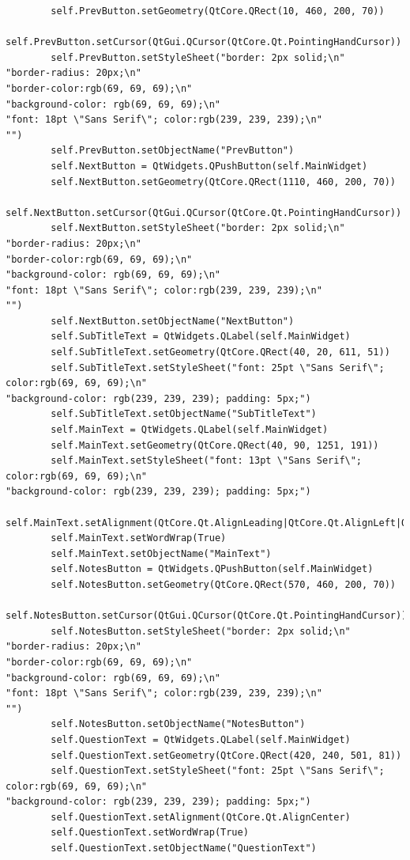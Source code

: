 \documentclass{article}
\begin{document}
\begin{lstlisting}
        self.PrevButton.setGeometry(QtCore.QRect(10, 460, 200, 70))
        self.PrevButton.setCursor(QtGui.QCursor(QtCore.Qt.PointingHandCursor))
        self.PrevButton.setStyleSheet("border: 2px solid;\n"
"border-radius: 20px;\n"
"border-color:rgb(69, 69, 69);\n"
"background-color: rgb(69, 69, 69);\n"
"font: 18pt \"Sans Serif\"; color:rgb(239, 239, 239);\n"
"")
        self.PrevButton.setObjectName("PrevButton")
        self.NextButton = QtWidgets.QPushButton(self.MainWidget)
        self.NextButton.setGeometry(QtCore.QRect(1110, 460, 200, 70))
        self.NextButton.setCursor(QtGui.QCursor(QtCore.Qt.PointingHandCursor))
        self.NextButton.setStyleSheet("border: 2px solid;\n"
"border-radius: 20px;\n"
"border-color:rgb(69, 69, 69);\n"
"background-color: rgb(69, 69, 69);\n"
"font: 18pt \"Sans Serif\"; color:rgb(239, 239, 239);\n"
"")
        self.NextButton.setObjectName("NextButton")
        self.SubTitleText = QtWidgets.QLabel(self.MainWidget)
        self.SubTitleText.setGeometry(QtCore.QRect(40, 20, 611, 51))
        self.SubTitleText.setStyleSheet("font: 25pt \"Sans Serif\"; color:rgb(69, 69, 69);\n"
"background-color: rgb(239, 239, 239); padding: 5px;")
        self.SubTitleText.setObjectName("SubTitleText")
        self.MainText = QtWidgets.QLabel(self.MainWidget)
        self.MainText.setGeometry(QtCore.QRect(40, 90, 1251, 191))
        self.MainText.setStyleSheet("font: 13pt \"Sans Serif\"; color:rgb(69, 69, 69);\n"
"background-color: rgb(239, 239, 239); padding: 5px;")
        self.MainText.setAlignment(QtCore.Qt.AlignLeading|QtCore.Qt.AlignLeft|QtCore.Qt.AlignTop)
        self.MainText.setWordWrap(True)
        self.MainText.setObjectName("MainText")
        self.NotesButton = QtWidgets.QPushButton(self.MainWidget)
        self.NotesButton.setGeometry(QtCore.QRect(570, 460, 200, 70))
        self.NotesButton.setCursor(QtGui.QCursor(QtCore.Qt.PointingHandCursor))
        self.NotesButton.setStyleSheet("border: 2px solid;\n"
"border-radius: 20px;\n"
"border-color:rgb(69, 69, 69);\n"
"background-color: rgb(69, 69, 69);\n"
"font: 18pt \"Sans Serif\"; color:rgb(239, 239, 239);\n"
"")
        self.NotesButton.setObjectName("NotesButton")
        self.QuestionText = QtWidgets.QLabel(self.MainWidget)
        self.QuestionText.setGeometry(QtCore.QRect(420, 240, 501, 81))
        self.QuestionText.setStyleSheet("font: 25pt \"Sans Serif\"; color:rgb(69, 69, 69);\n"
"background-color: rgb(239, 239, 239); padding: 5px;")
        self.QuestionText.setAlignment(QtCore.Qt.AlignCenter)
        self.QuestionText.setWordWrap(True)
        self.QuestionText.setObjectName("QuestionText")

\end{lstlisting}
\end{document}
